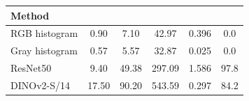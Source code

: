 \begin{tabularx}{\linewidth}{@{}X S[table-format=2.2] S[table-format=2.2] S[table-format=3.2] S[table-format=1.3] S[table-format=2.1]@{}}
\toprule
Method & {} & {} & {} & {} & {} \\
\midrule
RGB histogram & 0.90 & 7.10 & 42.97 & 0.396 & 0.0 \\
Gray histogram & 0.57 & 5.57 & 32.87 & 0.025 & 0.0 \\
ResNet50 & 9.40 & 49.38 & 297.09 & 1.586 & 97.8 \\
DINOv2-S/14 & 17.50 & 90.20 & 543.59 & 0.297 & 84.2 \\
\bottomrule\end{tabularx}
